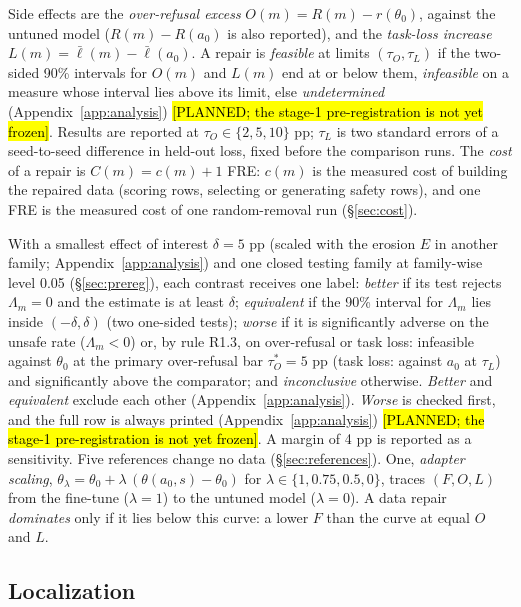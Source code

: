 \documentclass{article}
\theoremstyle{plain}
\theoremstyle{definition}
\theoremstyle{remark}
\newcommand{\ph}[1]{\hl{#1}}
\begin{document}
Side effects are the \emph{over-refusal excess} $O(m) = R(m) - r(\theta_0)$,
against the untuned model ($R(m) - R(a_0)$ is also reported), and the
\emph{task-loss increase} $L(m) = \bar\ell(m) - \bar\ell(a_0)$. A repair is \emph{feasible} at limits $(\tau_O, \tau_L)$ if the two-sided 90\%
intervals for $O(m)$ and $L(m)$ end at or below them, \emph{infeasible} on a
measure whose interval lies above its limit, else \emph{undetermined}
(Appendix~\ref{app:analysis}) \ph{[PLANNED; the stage-1 pre-registration is
not yet frozen]}. Results are reported at $\tau_O \in \{2, 5, 10\}$ pp;
$\tau_L$ is two standard errors of a seed-to-seed difference in held-out loss,
fixed before the comparison runs. The \emph{cost} of a repair is
$C(m) = c(m) + 1$ FRE: $c(m)$ is the measured cost of building the repaired
data (scoring rows, selecting or generating safety rows), and one FRE is the
measured cost of one random-removal run (\S\ref{sec:cost}).

With a smallest effect of interest $\delta = 5$ pp (scaled with the erosion $E$
in another family; Appendix~\ref{app:analysis}) and one closed testing family at family-wise level 0.05 (\S\ref{sec:prereg}), each contrast receives
one label: \emph{better} if its test rejects $\Lambda_m = 0$ and the estimate
is at least $\delta$; \emph{equivalent} if the 90\% interval for $\Lambda_m$
lies inside $(-\delta, \delta)$ (two one-sided tests); \emph{worse} if it is
significantly adverse on the unsafe rate ($\Lambda_m < 0$) or, by rule R1.3,
on over-refusal or task loss: infeasible against $\theta_0$ at the primary
over-refusal bar $\tau_O^* = 5$ pp (task loss: against $a_0$ at $\tau_L$) and
significantly above the comparator; and \emph{inconclusive} otherwise.
\emph{Better} and \emph{equivalent} exclude each other
(Appendix~\ref{app:analysis}). \emph{Worse} is checked first, and the full row is always printed
(Appendix~\ref{app:analysis})
\ph{[PLANNED; the stage-1 pre-registration is not yet frozen]}. A margin of 4 pp is reported as a sensitivity. Five references change no data (\S\ref{sec:references}). One, \emph{adapter
scaling}, $\theta_\lambda = \theta_0 + \lambda\,(\theta(a_0, s) - \theta_0)$
for $\lambda \in \{1, 0.75, 0.5, 0\}$, traces $(F, O, L)$ from the fine-tune
($\lambda = 1$) to the untuned model ($\lambda = 0$). A data repair
\emph{dominates} only if it lies below this curve: a lower $F$ than the curve
at equal $O$ and $L$.

\subsection{Localization}
\label{sec:localization}
\end{document}
